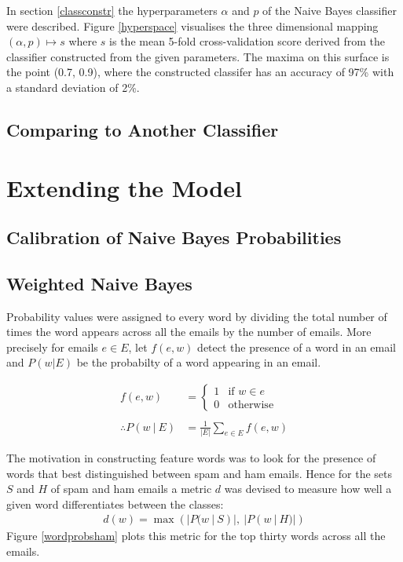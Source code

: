 \documentclass[12pt, a4paper]{article}
\begin{document}
  In section \ref{classconstr} the hyperparameters $\alpha$ and $p$ of the Naive Bayes classifier were described. Figure \ref{hyperspace} visualises the three dimensional mapping $(\alpha, p) \mapsto s$ where $s$ is the mean 5-fold cross-validation score derived from the classifier constructed from the given parameters. The maxima on this surface is the point (0.7, 0.9), where the constructed classifer has an accuracy of 97\% with a standard deviation of 2\%.

  \subsection{Comparing to Another Classifier}



  \section{Extending the Model}

  \subsection{Calibration of Naive Bayes Probabilities}

  \subsection{Weighted Naive Bayes}

  Probability values were assigned to every word by dividing the total number of times the word appears across all the emails by the number of emails. More precisely for emails $e \in E$, let $f(e, w)$ detect the presence of a word in an email and $P(w | E)$ be the probabilty of a word appearing in an email.

  \vspace{-0.5cm}
  \begin{align*}
    f(e, w) &= \begin{cases}
      1   & \text{if } w \in e \\
      0   & \text{otherwise}
    \end{cases} \\
    \\
    \therefore P(w\ |\ E) &= \frac{1}{|E|}\sum_{e \in E}{f(e, w)}
  \end{align*}
  \vspace{-0.5cm}

  The motivation in constructing feature words was to look for the presence of words that best distinguished between spam and ham emails. Hence for the sets $S$ and $H$ of spam and ham emails a metric $d$ was devised to measure how well a given word differentiates between the classes:
  \vspace{-0.5cm}
  \begin{align*}
    d(w) = \max(|P(w\ |\ S)|,\ |P(w\ |\ H)|)
  \end{align*}
  Figure \ref{wordprobsham} plots this metric for the top thirty words across all the emails.
\end{document}
